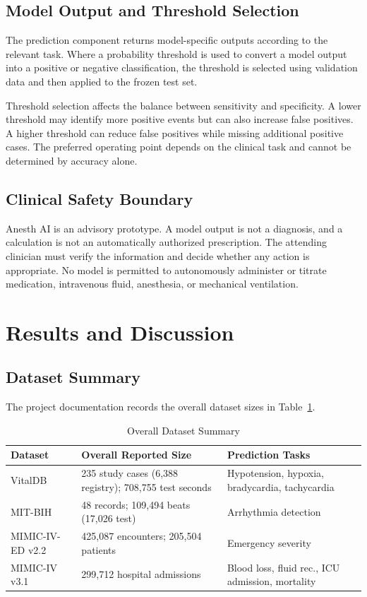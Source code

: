 \documentclass[conference]{IEEEtran}
\begin{document}
\subsection{Model Output and Threshold Selection}
The prediction component returns model-specific outputs according to the relevant task. Where a probability threshold is used to convert a model output into a positive or negative classification, the threshold is selected using validation data and then applied to the frozen test set.

Threshold selection affects the balance between sensitivity and specificity. A lower threshold may identify more positive events but can also increase false positives. A higher threshold can reduce false positives while missing additional positive cases. The preferred operating point depends on the clinical task and cannot be determined by accuracy alone.

\subsection{Clinical Safety Boundary}
Anesth AI is an advisory prototype. A model output is not a diagnosis, and a calculation is not an automatically authorized prescription. The attending clinician must verify the information and decide whether any action is appropriate. No model is permitted to autonomously administer or titrate medication, intravenous fluid, anesthesia, or mechanical ventilation.

\section{Results and Discussion}

\subsection{Dataset Summary}
The project documentation records the overall dataset sizes in Table~\ref{tab:dataset_summary}.

\begin{table}[htbp]
\centering
\caption{Overall Dataset Summary}
\label{tab:dataset_summary}
\begin{tabularx}{\columnwidth}{l p{3.8cm} p{2.8cm}}
\toprule
\textbf{Dataset} & \textbf{Overall Reported Size} & \textbf{Prediction Tasks} \\
\midrule
VitalDB & 235 study cases (6,388 registry); 708,755 test seconds & Hypotension, hypoxia, bradycardia, tachycardia \\
MIT-BIH & 48 records; 109,494 beats (17,026 test) & Arrhythmia detection \\
MIMIC-IV-ED v2.2 & 425,087 encounters; 205,504 patients & Emergency severity \\
MIMIC-IV v3.1 & 299,712 hospital admissions & Blood loss, fluid rec., ICU admission, mortality \\
\bottomrule
\end{tabularx}
\end{table}
\end{document}
